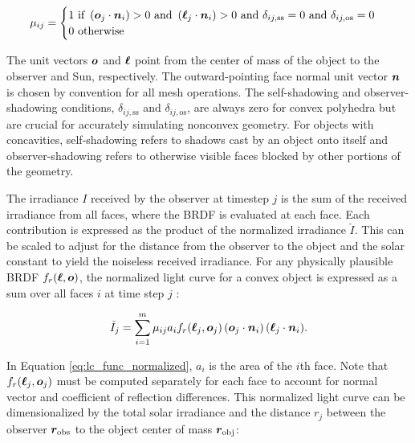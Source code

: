 \begin{equation} \label{eq:cvx_shadow_cond}
  \mu_{ij} = \begin{cases}
    1 \text{ if } \left( \bm{o}_j \cdot \bm{n}_i \right) > 0 \text{ and } \left( \bm{\ell}_j \cdot \bm{n}_i \right) > 0 
	  \text{ and } \delta_{ij,\text{ss}} = 0 \text{ and } \delta_{ij,\text{os}} = 0\\
    0 \text{ otherwise } \\
  \end{cases}
\end{equation}

The unit vectors $\bm{o}$ and $\bm{\ell}$ point from the center of mass of the object to the observer and Sun, respectively. The outward-pointing face normal unit vector $\bm{n}$ is chosen by convention for all mesh operations. The self-shadowing and observer-shadowing conditions, $\delta_{ij,\text{ss}}$ and $\delta_{ij,\text{os}}$, are always zero for convex polyhedra but are crucial for accurately simulating nonconvex geometry. For objects with concavities, self-shadowing refers to shadows cast by an object onto itself and observer-shadowing refers to otherwise visible faces blocked by other portions of the geometry.

The irradiance $I$ received by the observer at timestep $j$ is the sum of the received irradiance from all faces, where the BRDF is evaluated at each face. Each contribution is expressed as the product of the
normalized irradiance $\check{I}$. This can be scaled to adjust for the distance from the observer to
the object and the solar constant to yield the noiseless received irradiance. For any physically plausible BRDF $f_r(\bm{\ell}, \bm{o})$, the normalized light curve for a convex object is expressed as a sum over all faces $i$ at time step $j$ \cite{fan2020thesis}:

\begin{equation} \label{eq:lc_func_normalized}
  \check{I}_{j} = \sum_{i=1}^{m}{\mu_{ij} a_i f_r(\bm{\ell}_j, \bm{o}_j) \left( \bm{o}_j \cdot \bm{n}_i \right) \left( \bm{\ell}_j \cdot \bm{n}_i \right)}.
\end{equation}

In Equation \ref{eq:lc_func_normalized}, $a_i$ is the area of the $i$th face. Note that $f_r(\bm{\ell}_j, \bm{o}_j)$ must be computed separately for each face to account for normal vector and coefficient of reflection differences. This normalized light curve can be dimensionalized by the total solar irradiance and the distance $r_j$ between the observer $\bm{r}_\mathrm{obs}$ to the object center of mass $\bm{r}_\mathrm{obj}$:

